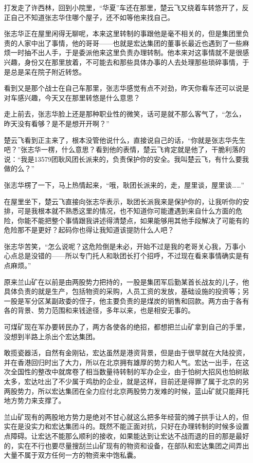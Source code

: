 打发走了许西林，回到小院里，“华夏”车还在那里，楚云飞又绕着车转悠开了，反正自己不知道张志华住哪个屋子，还不如等他来找自己。

张志华正在屋里闲得无聊呢，本来这里转制的事跟他是毫不相关的，但是集团里负责的人家中出了事情，他的哥哥——也就是宏达集团的董事长最近也遇到了一些麻烦一时抽不出人手，于是委派他来这里负责办理转制。他本来对这事情就不是很感兴趣，身份又在那里放着，不可能去和那些具体办事的人去处理那些琐碎事情，于是总是呆在院子附近转悠。

看到又是那个战士在自己车那里，张志华感觉有点不对劲，昨天你看车还可以说是对车感兴趣，今天又在那里转悠是什么意思？

走上前去，张志华脸上还是那种职业性的微笑，话可是就不那么客气了，“怎么，昨天没有看够？是不是想开开啊？”

楚云飞看到正主来了，根本没管他说什么，直接说自己的话，“你就是张志华先生吧？”张志华一楞，什么意思？看到他的表情，楚云飞肯定就是他了，干脆利落的说：“我是13579团耿风团长派来的，负责保护你的安全。我叫楚云飞，有什么要我做的么？”

张志华楞了一下，马上热情起来，“哦，耿团长派来的，走，屋里谈，屋里谈……”

在屋里坐下，楚云飞直接向张志华表示，耿团长派我来是保护你的，让我听你的安排，可是我根本就不熟悉这里的情况，也不知道你可能遭遇到来自什么方面的危险，你能不能把整个事情跟我讲述得清楚点，如果能够用其他手段解决了可能有的危险那不是更好？起码你也得让我知道该提防什么人吧？

张志华苦笑，“怎么说呢？这危险倒是未必，开始不过是我的老哥关心我，万事小心点总是没错的——所以专门托人和耿团长打个招呼，不过现在看来事情确实是有点麻烦。”

原来兰山矿在以前是由两股势力把持的，一股是集团军后勤某首长战友的儿子，他具体负责的就是生产，包括物资的采购，人员工资的发放，基础设施的投资等；另一股是军分区某副政委的侄子，他主要负责的是煤炭的销售和回款。两方由于各有各的背景、势力范围和来钱途径，多年以来，也是相安无事的。

可煤矿现在军办要转民办了，两方各使各的绝招，都想把兰山矿拿到自己的手里，没想到半路上杀出个宏达集团。

敢揽瓷器活，自然有金刚钻，宏达虽然是港资背景，但是由于很早就在大陆投资，并在香港回归时出了大力，所以在北京拥有雄厚的势力和人气。宏达一出手，在这次全国性的整改中就席卷了相当数量待转制的军办企业，由于怕树大招风也怕树敌太多，宏达吐出了不少属于鸡肋的企业，就是这样，目前还是得罪了属于北京的另两股势力，所以宏达集团在全力应付北京两股势力发难的时候，蓝山矿就只能拜托地方势力来支撑了。

兰山矿现有的两股地方势力是绝对不甘心就这么把多年经营的摊子拱手让人的，但实在是没实力和宏达集团斗的。既然不能正面对抗，只好在办理转制的时候多设置点障碍。让宏达不能那么顺利的接收，如果能达到让宏达不战而退的目的那是最好的，实在不行也要尽量搜刮兰山矿现有的物资和设备，在部队和宏达集团之间弄出大量不属于双方任何一方的物资来中饱私囊。


